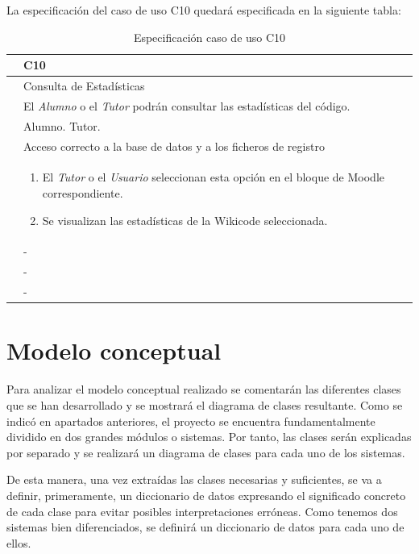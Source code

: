 La especificación del caso de uso C10 quedará especificada en la siguiente tabla:

\begin{table}[h]
\centering
\begin{tabular}{ | p{} | p{} | }
	\hline
	\cellcolor[gray]{.8}{ID} & C10 \\
	\hline 
	\cellcolor[gray]{.8}{Nombre} & Consulta de Estadísticas \\
	\hline
	\cellcolor[gray]{.8}{Descripción} & El \emph{Alumno} o el \emph{Tutor} podrán consultar las estadísticas del código. \\
	\hline
	\cellcolor[gray]{.8}{Actores} & Alumno. Tutor. \\
	\hline
	\cellcolor[gray]{.8}{Asunciones} & Acceso correcto a la base de datos y a los ficheros de registro \\
	\hline
	\cellcolor[gray]{.8}{Pasos} & \begin{enumerate}
		\item El \emph{Tutor} o el \emph{Usuario} seleccionan esta opción en el bloque de Moodle correspondiente. 
		\item Se visualizan las estadísticas de la Wikicode seleccionada.
		\end{enumerate} \\
	\hline
	\cellcolor[gray]{.8}{Variaciones} & - \\
	\hline
	\cellcolor[gray]{.8}{Requisitos no funcionales} & - \\
	\hline
	\cellcolor[gray]{.8}{Cuestiones} & - \\
	\hline
	
\end{tabular}
\caption{Especificación caso de uso C10}
\end{table}

\section{Modelo conceptual}

Para analizar el modelo conceptual realizado se comentarán las diferentes clases que se han desarrollado y se mostrará el diagrama de clases resultante. Como se indicó en apartados anteriores, el proyecto se encuentra fundamentalmente dividido en dos grandes módulos o sistemas. Por tanto, las clases serán explicadas por separado y se realizará un diagrama de clases para cada uno de los sistemas.

De esta manera, una vez extraídas las clases necesarias y suficientes, se va a definir, primeramente, un diccionario de datos expresando el significado concreto de cada clase para evitar posibles interpretaciones erróneas. Como tenemos dos sistemas bien diferenciados, se definirá un diccionario de datos para cada uno de ellos.

